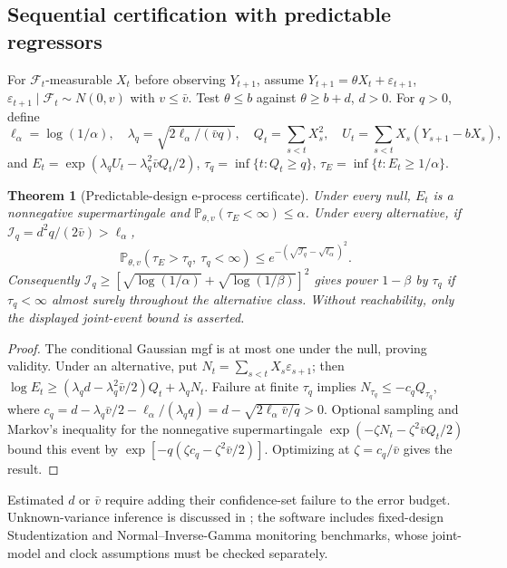 \documentclass[11pt]{article}
\numberwithin{equation}{section}
\theoremstyle{plain}
\newtheorem{theorem}{Theorem}[section]
\theoremstyle{definition}
\theoremstyle{remark}
\begin{document}
\subsection{Sequential certification with predictable regressors}\label{predictable-design-anytime-achievability}
For $\mathcal F_t$-measurable $X_t$ before observing $Y_{t+1}$, assume $Y_{t+1}=\theta X_t+\varepsilon_{t+1}$, $\varepsilon_{t+1}\mid\mathcal F_t\sim N(0,v)$ with $v\le\bar v$. Test $\theta\le b$ against $\theta\ge b+d$, $d>0$. For $q>0$, define
\[
\ell_\alpha=\log(1/\alpha),\quad \lambda_q=\sqrt{2\ell_\alpha/(\bar v q)},\quad
Q_t=\sum_{s<t}X_s^2,\quad U_t=\sum_{s<t}X_s(Y_{s+1}-bX_s),
\]
and $E_t=\exp(\lambda_qU_t-\lambda_q^2\bar vQ_t/2)$, $\tau_q=\inf\{t:Q_t\ge q\}$, $\tau_E=\inf\{t:E_t\ge1/\alpha\}$.
\begin{theorem}[Predictable-design e-process certificate]\label{thm:predictable-certificate}
Under every null, $E_t$ is a nonnegative supermartingale and $\mathbb P_{\theta,v}(\tau_E<\infty)\le\alpha$. Under every alternative, if $\mathcal I_q=d^2q/(2\bar v)>\ell_\alpha$,
\[
\mathbb P_{\theta,v}(\tau_E>\tau_q,\ \tau_q<\infty)
\le e^{-(\sqrt{\mathcal I_q}-\sqrt{\ell_\alpha})^2}.
\]
Consequently $\mathcal I_q\ge[\sqrt{\log(1/\alpha)}+\sqrt{\log(1/\beta)}]^2$ gives power $1-\beta$ by $\tau_q$ if $\tau_q<\infty$ almost surely throughout the alternative class. Without reachability, only the displayed joint-event bound is asserted.
\end{theorem}
\begin{proof}
The conditional Gaussian mgf is at most one under the null, proving validity. Under an alternative, put $N_t=\sum_{s<t}X_s\varepsilon_{s+1}$; then $\log E_t\ge(\lambda_qd-\lambda_q^2\bar v/2)Q_t+\lambda_qN_t$. Failure at finite $\tau_q$ implies $N_{\tau_q}\le-c_qQ_{\tau_q}$, where $c_q=d-\lambda_q\bar v/2-\ell_\alpha/(\lambda_qq)=d-\sqrt{2\ell_\alpha\bar v/q}>0$. Optional sampling and Markov's inequality for the nonnegative supermartingale $\exp(-\zeta N_t-\zeta^2\bar vQ_t/2)$ bound this event by $\exp[-q(\zeta c_q-\zeta^2\bar v/2)]$. Optimizing at $\zeta=c_q/\bar v$ gives the result.
\end{proof}
Estimated $d$ or $\bar v$ require adding their confidence-set failure to the error budget. Unknown-variance inference is discussed in \cite{wangramdas2025,koningvanmeer2026}; the software includes fixed-design Studentization and Normal--Inverse-Gamma monitoring benchmarks, whose joint-model and clock assumptions must be checked separately.\label{nig-confidence-sequences}
\end{document}
